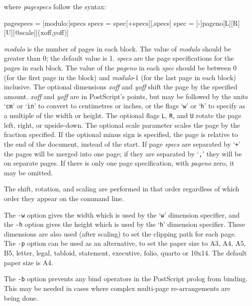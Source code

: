 \documentclass[twoside,11pt]{starlink}
\begin{document}
\begin{itemize}
where \emph{pagespecs} follow the syntax:

\begin{small}
\begin{terminalv}
pagespecs = [modulo:]specs
specs = spec[+specs][,specs]
spec = [-]pageno[L][R][U][@scale][(xoff,yoff)]
\end{terminalv}
\end{small}

\emph{modulo} is the number of pages in each block. The value of \emph{modulo} should be greater than 0; the default value is 1. \emph{specs}
are the page specifications for the pages in each block. The value of
the \emph{pageno} in each \emph{spec} should be between 0 (for the first
page in the block) and \emph{modulo}-1 (for the last page in each
block) inclusive. The optional dimensions \emph{xoff} and \emph{yoff}
shift the page by the specified amount. \emph{xoff} and \emph{yoff} are
in PostScript's points, but may be followed by the units `\texttt{cm}' or
`\texttt{in}' to convert to centimetres or inches, or the flags `\texttt{w}'
or `\texttt{h}' to specify as a multiple of the width or height. The
optional flags \texttt{L}, \texttt{R}, and \texttt{U} rotate the page left,
right, or upside-down. The optional scale parameter scales the page by
the fraction specified. If the optional minus sign is specified, the
page is relative to the end of the document, instead of the start. If
page \emph{specs} are separated by `\texttt{+}' the pages will be merged
into one page; if they are separated by `\texttt{,}' they will be on
separate pages. If there is only one page specification, with \emph{pageno} zero, it may be omitted.

The shift, rotation, and scaling are performed in that order
regardless of which order they appear on the command line.

The \texttt{-w} option gives the width which is used by the `\texttt{w}'
dimension specifier, and the \texttt{-h} option gives the height which is
used by the `\texttt{h}' dimension specifier. These dimensions are also
used (after scaling) to set the clipping path for each page. The \texttt{-p} option can be used as an alternative, to set the paper size to A3,
A4, A5, B5, letter, legal, tabloid, statement, executive, folio,
quarto or 10x14. The default paper size is A4.

The \texttt{-b} option prevents any bind operators in the PostScript
prolog from binding. This may be needed in cases where complex
multi-page re-arrangements are being done.


\end{itemize}
\end{document}
